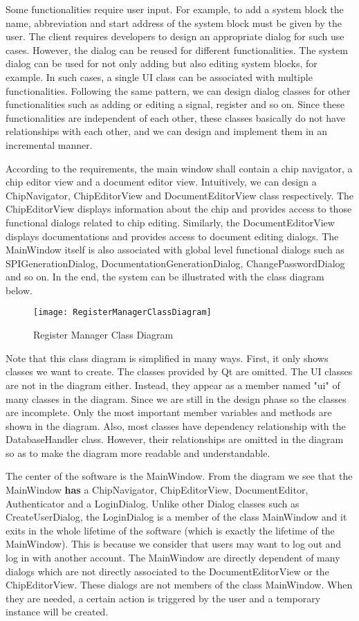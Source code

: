 Some functionalities require user input. For example, to add a system block the name, abbreviation and start address of the system block must be given by the user. The client requires developers to design an appropriate dialog for such use cases. However, the dialog can be reused for different functionalities. The system dialog can be used for not only adding but also editing system blocks, for example. In such cases, a single UI class can be associated with multiple functionalities. Following the same pattern, we can design dialog classes for other functionalities such as adding or editing a signal, register and so on. Since these functionalities are independent of each other, these classes basically do not have relationships with each other, and we can design and implement them in an incremental manner.

According to the requirements, the main window shall contain a chip navigator, a chip editor view and a document editor view. Intuitively, we can design a ChipNavigator, ChipEditorView and DocumentEditorView class respectively. The ChipEditorView displays information about the chip and provides access to those functional dialogs related to chip editing. Similarly, the DocumentEditorView displays documentations and provides access to document editing dialogs. The MainWindow itself is also associated with global level functional dialogs such as SPIGenerationDialog, DocumentationGenerationDialog, ChangePasswordDialog and so on. In the end, the system can be illustrated with the class diagram below.

\begin{figure}[htbp]
\centering
\texttt{[image: RegisterManagerClassDiagram]}
\caption{Register Manager Class Diagram\label{fig:Register Manager Class Diagram}}
\end{figure}

Note that this class diagram is simplified in many ways. First, it only shows classes we want to create. The classes provided by Qt are omitted. The UI classes are not in the diagram either. Instead, they appear as a member named "ui" of many classes in the diagram. Since we are still in the design phase so the classes are incomplete. Only the most important member variables and methods are shown in the diagram. Also, most classes have dependency relationship with the DatabaseHandler class. However, their relationships are omitted in the diagram so as to make the diagram more readable and understandable.

The center of the software is the MainWindow. From the diagram we see that the MainWindow \textbf{has} a ChipNavigator, ChipEditorView, DocumentEditor, Authenticator and a LoginDialog. Unlike other Dialog classes such as CreateUserDialog, the LoginDialog is a member of the class MainWindow and it exits in the whole lifetime of the software (which is exactly the lifetime of the MainWindow). This is because we consider that users may want to log out and log in with another account. The MainWindow are directly dependent of many dialogs which are not directly associated to the DocumentEditorView or the ChipEditorView. These dialogs are not members of the class MainWindow. When they are needed, a certain action is triggered by the user and a temporary instance will be created.

